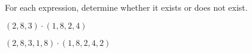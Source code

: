 \begin{problem}
For each expression, determine whether it exists or does not exist.

$(2,8,3)\cdot (1,8,2,4)$
\begin{multipleChoice}
\end{multipleChoice}

$(2,8,3,1,8)\cdot (1,8,2,4,2)$
\begin{multipleChoice}
\end{multipleChoice}
\end{problem}
